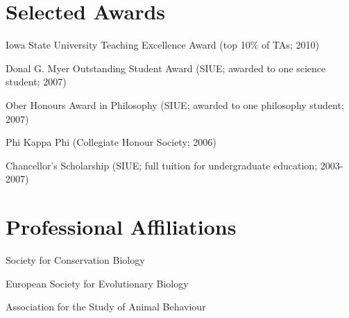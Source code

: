 \documentclass[letterpaper]{article}
\renewenvironment{itemize}{
  \begin{list}{}{
    \setlength{\leftmargin}{1.5em}
  }
}{
  \end{list}
}
\begin{document}
\section*{Selected Awards}
\begin{itemize}
\item Iowa State University Teaching Excellence Award (top 10\% of TAs; 2010)
\item Donal G. Myer Outstanding Student Award (SIUE; awarded to one science student; 2007)
\item Ober Honours Award in Philosophy (SIUE; awarded to one philosophy student; 2007)
\item Phi Kappa Phi (Collegiate Honour Society; 2006)
\item Chancellor's Scholarship (SIUE; full tuition for undergraduate education; 2003-2007)
\end{itemize}

\section*{Professional Affiliations}
\begin{itemize}
\item Society for Conservation Biology %
\item European Society for Evolutionary Biology
\item Association for the Study of Animal Behaviour
\end{itemize}




\end{document}
